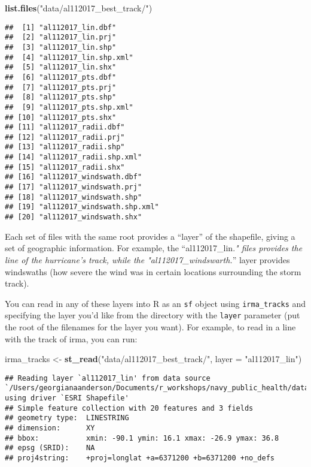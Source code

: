\documentclass[]{tufte-book}
\newenvironment{Shaded}{}{}
\newcommand{\DataTypeTok}[1]{\textcolor[rgb]{0.56,0.13,0.00}{#1}}
\newcommand{\KeywordTok}[1]{\textcolor[rgb]{0.00,0.44,0.13}{\textbf{#1}}}
\newcommand{\NormalTok}[1]{#1}
\newcommand{\StringTok}[1]{\textcolor[rgb]{0.25,0.44,0.63}{#1}}
\begin{document}
\begin{Shaded}
\begin{Highlighting}[]
\KeywordTok{list.files}\NormalTok{(}\StringTok{"data/al112017_best_track/"}\NormalTok{)}
\end{Highlighting}
\end{Shaded}

\begin{verbatim}
##  [1] "al112017_lin.dbf"          
##  [2] "al112017_lin.prj"          
##  [3] "al112017_lin.shp"          
##  [4] "al112017_lin.shp.xml"      
##  [5] "al112017_lin.shx"          
##  [6] "al112017_pts.dbf"          
##  [7] "al112017_pts.prj"          
##  [8] "al112017_pts.shp"          
##  [9] "al112017_pts.shp.xml"      
## [10] "al112017_pts.shx"          
## [11] "al112017_radii.dbf"        
## [12] "al112017_radii.prj"        
## [13] "al112017_radii.shp"        
## [14] "al112017_radii.shp.xml"    
## [15] "al112017_radii.shx"        
## [16] "al112017_windswath.dbf"    
## [17] "al112017_windswath.prj"    
## [18] "al112017_windswath.shp"    
## [19] "al112017_windswath.shp.xml"
## [20] "al112017_windswath.shx"
\end{verbatim}

Each set of files with the same root provides a ``layer'' of the shapefile, giving a set
of geographic information. For example, the ``al112017\_lin.\emph{" files provides the
line of the hurricane's track, while the "al112017\_windswarth.}'' layer provides windswaths
(how severe the wind was in certain locations surrounding the storm track).

You can read in any of these layers into R as an \texttt{sf} object using \texttt{irma\_tracks} and specifying
the layer you'd like from the directory with the \texttt{layer} parameter (put the root of the filenames
for the layer you want). For example, to read in a line with the track of irma, you can run:

\begin{Shaded}
\begin{Highlighting}[]
\NormalTok{irma_tracks <-}\StringTok{ }\KeywordTok{st_read}\NormalTok{(}\StringTok{"data/al112017_best_track/"}\NormalTok{, }
    \DataTypeTok{layer =} \StringTok{"al112017_lin"}\NormalTok{)}
\end{Highlighting}
\end{Shaded}

\begin{verbatim}
## Reading layer `al112017_lin' from data source `/Users/georgianaanderson/Documents/r_workshops/navy_public_health/data/al112017_best_track' using driver `ESRI Shapefile'
## Simple feature collection with 20 features and 3 fields
## geometry type:  LINESTRING
## dimension:      XY
## bbox:           xmin: -90.1 ymin: 16.1 xmax: -26.9 ymax: 36.8
## epsg (SRID):    NA
## proj4string:    +proj=longlat +a=6371200 +b=6371200 +no_defs
\end{verbatim}
\end{document}
